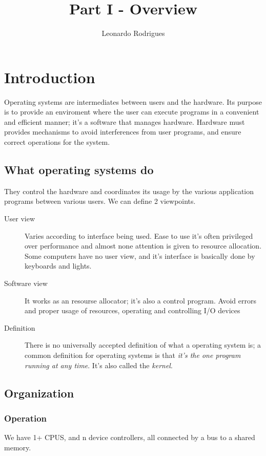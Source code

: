 \documentclass{article}
\title{Part I - Overview}
\author{Leonardo Rodrigues}
\begin{document}
\maketitle

\section{Introduction}
Operating systems are intermediates between users and the hardware.
Its purpose is to provide an enviroment where the user can execute programs in a convenient and efficient manner; it's a software that manages hardware.
Hardware must provides mechanisms to avoid interferences from user programs, and ensure correct operations for the system.

\subsection{What operating systems do}
They control the hardware and coordinates its usage by the various application programs between various users. We can define 2 viewpoints.

\begin{description}
  \item[User view] Varies according to interface being used. Ease to use it's often privileged over performance and almost none attention is given to resource allocation.
  Some computers have no user view, and it's interface is basically done by keyboards and lights.
  \item[Software view] It works as an resourse allocator; it's also a control program. Avoid errors and proper usage of resources, operating and controlling I/O devices
  \item[Definition] There is no universally accepted definition of what a operating system is; a common definition for operating systems is that \emph{it's the one program running at any time}. It's also called the \emph{kernel}.
\end{description}

\subsection{Organization}
\subsubsection{Operation}
We have 1+ CPUS, and n device controllers, all connected by a bus to a shared memory.
\end{document}
